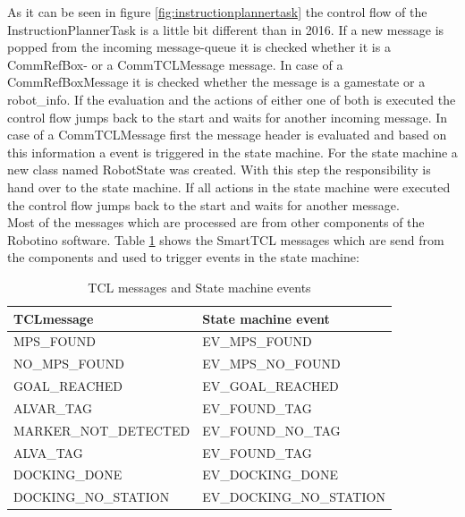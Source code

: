 As it can be seen in figure \ref{fig:instructionplannertask} the control flow of the InstructionPlannerTask is a little bit different than in 2016. If a new message is popped from the incoming message-queue it is checked whether it is a CommRefBox- or a CommTCLMessage message. In case of a CommRefBoxMessage it is checked whether the message is a gamestate or a robot\_info. If the evaluation and the actions of either one of both is executed the control flow jumps back to the start and waits for another incoming message. In case of a CommTCLMessage first the message header is evaluated and based on this information a event is triggered in the state machine. For the state machine a new class named RobotState was created. With this step the responsibility is hand over to the state machine. If all actions in the state machine were executed the control flow jumps back to the start and waits for another message. \\ 

Most of the messages which are processed are from other components of the Robotino software. Table \ref{tab:tcl_state} shows the SmartTCL messages which are send from the components and used to trigger events in the state machine: \\

\begin {table}[h]
\caption{TCL messages and State machine events}
\label{tab:tcl_state}
\begin{center}

\begin{tabular}{|l|l|}
\hline 
TCLmessage & State machine event \\ 
\hline 
MPS\_FOUND & EV\_MPS\_FOUND \\ 
\hline 
NO\_MPS\_FOUND & EV\_MPS\_NO\_FOUND \\ 
\hline 
GOAL\_REACHED & EV\_GOAL\_REACHED\\ 
\hline 
ALVAR\_TAG & EV\_FOUND\_TAG \\ 
\hline 
MARKER\_NOT\_DETECTED & EV\_FOUND\_NO\_TAG \\ 
\hline 
ALVA\_TAG & EV\_FOUND\_TAG \\ 
\hline 
DOCKING\_DONE & EV\_DOCKING\_DONE \\ 
\hline 
DOCKING\_NO\_STATION & EV\_DOCKING\_NO\_STATION \\ 
\hline 
\end{tabular} 
\end{center}
\end {table}

\bigskip

